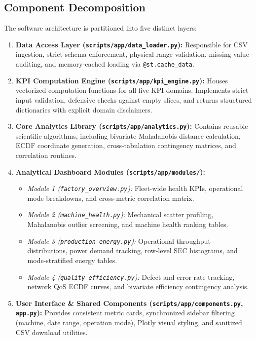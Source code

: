\documentclass[journal]{IEEEtran}
\begin{document}
\subsection{Component Decomposition}
The software architecture is partitioned into five distinct layers:
\begin{enumerate}
    \item \textbf{Data Access Layer (\texttt{scripts/app/data\_loader.py}):} Responsible for CSV ingestion, strict schema enforcement, physical range validation, missing value auditing, and memory-cached loading via \texttt{@st.cache\_data}.
    \item \textbf{KPI Computation Engine (\texttt{scripts/app/kpi\_engine.py}):} Houses vectorized computation functions for all five KPI domains. Implements strict input validation, defensive checks against empty slices, and returns structured dictionaries with explicit domain disclaimers.
    \item \textbf{Core Analytics Library (\texttt{scripts/app/analytics.py}):} Contains reusable scientific algorithms, including bivariate Mahalanobis distance calculation, ECDF coordinate generation, cross-tabulation contingency matrices, and correlation routines.
    \item \textbf{Analytical Dashboard Modules (\texttt{scripts/app/modules/}):}
    \begin{itemize}
        \item \textit{Module 1 (\texttt{factory\_overview.py}):} Fleet-wide health KPIs, operational mode breakdowns, and cross-metric correlation matrix.
        \item \textit{Module 2 (\texttt{machine\_health.py}):} Mechanical scatter profiling, Mahalanobis outlier screening, and machine health ranking tables.
        \item \textit{Module 3 (\texttt{production\_energy.py}):} Operational throughput distributions, power demand tracking, row-level SEC histograms, and mode-stratified energy tables.
        \item \textit{Module 4 (\texttt{quality\_efficiency.py}):} Defect and error rate tracking, network QoS ECDF curves, and bivariate efficiency contingency analysis.
    \end{itemize}
    \item \textbf{User Interface \& Shared Components (\texttt{scripts/app/components.py}, \texttt{app.py}):} Provides consistent metric cards, synchronized sidebar filtering (machine, date range, operation mode), Plotly visual styling, and sanitized CSV download utilities.
\end{enumerate}
\end{document}
